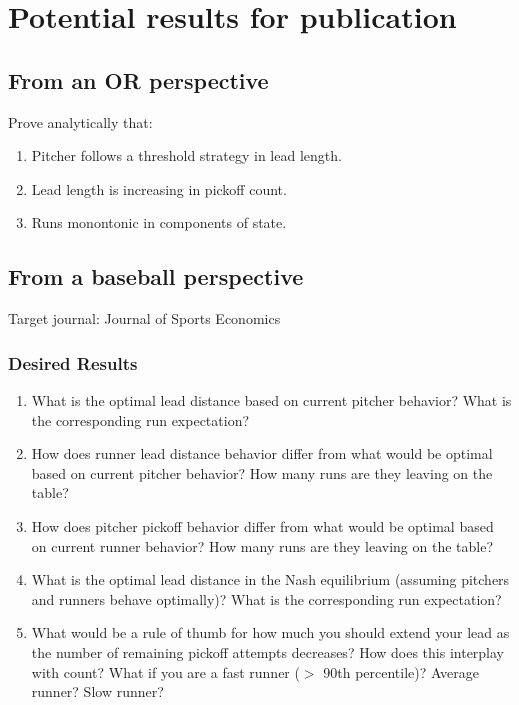\documentclass{article}
\begin{document}
\section{Potential results for publication}

\subsection{From an OR perspective}

Prove analytically that:
\begin{enumerate}
    \item Pitcher follows a threshold strategy in lead length. 
    \item Lead length is increasing in pickoff count. 
    \item Runs monontonic in components of state. 
\end{enumerate}

\subsection{From a baseball perspective}

Target journal: Journal of Sports Economics

\subsubsection*{Desired Results}

\begin{enumerate}
    \item What is the optimal lead distance based on current pitcher behavior? What is the corresponding run expectation?
    \item How does runner lead distance behavior differ from what would be optimal based on current pitcher behavior? How many runs are they leaving on the table?
    \item How does pitcher pickoff behavior differ from what would be optimal based on current runner behavior? How many runs are they leaving on the table?
    \item What is the optimal lead distance in the Nash equilibrium (assuming pitchers and runners behave optimally)? What is the corresponding run expectation?
    \item What would be a rule of thumb for how much you should extend your lead as the number of remaining pickoff attempts decreases? How does this interplay with count? What if you are a fast runner ($>$ 90th percentile)? Average runner? Slow runner?
\end{enumerate}
\end{document}
